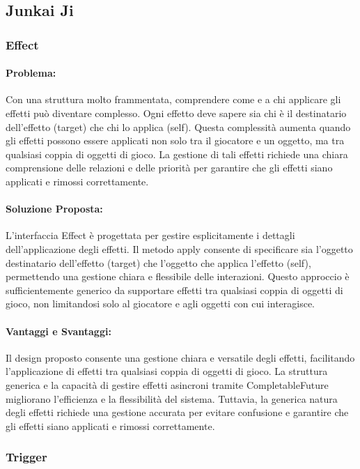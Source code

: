 \documentclass[a4paper,12pt]{report}
\begin{document}
\subsection{Junkai Ji}

\subsubsection{Effect}
\paragraph{Problema:} Con una struttura molto frammentata, comprendere come e a chi applicare gli effetti può diventare complesso. Ogni effetto deve sapere sia chi è il destinatario dell’effetto (target) che chi lo applica (self). Questa complessità aumenta quando gli effetti possono essere applicati non solo tra il giocatore e un oggetto, ma tra qualsiasi coppia di oggetti di gioco. La gestione di tali effetti richiede una chiara comprensione delle relazioni e delle priorità per garantire che gli effetti siano applicati e rimossi correttamente.
\paragraph{Soluzione Proposta:} L’interfaccia Effect è progettata per gestire esplicitamente i dettagli dell’applicazione degli effetti. Il metodo apply consente di specificare sia l’oggetto destinatario dell’effetto (target) che l’oggetto che applica l’effetto (self), permettendo una gestione chiara e flessibile delle interazioni. Questo approccio è sufficientemente generico da supportare effetti tra qualsiasi coppia di oggetti di gioco, non limitandosi solo al giocatore e agli oggetti con cui interagisce.
\paragraph{Vantaggi e Svantaggi:}
Il design proposto consente una gestione chiara e versatile degli effetti, facilitando l’applicazione di effetti tra qualsiasi coppia di oggetti di gioco. La struttura generica e la capacità di gestire effetti asincroni tramite CompletableFuture migliorano l’efficienza e la flessibilità del sistema. Tuttavia, la generica natura degli effetti richiede una gestione accurata per evitare confusione e garantire che gli effetti siano applicati e rimossi correttamente.


\subsubsection{Trigger}
\end{document}
